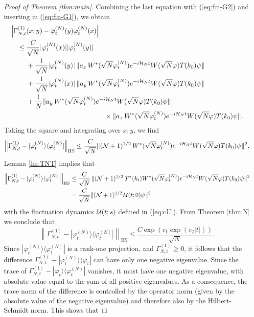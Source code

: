 \documentclass[11pt,a4paper]{article}
\newcommand{\cU}{{\cal U}}
\newcommand{\cH}{{\cal H}}
\newcommand{\cN}{{\cal N}}
\begin{document}
\begin{proof}[Proof of Theorem \ref{thm:main}]
Combining the last equation with (\ref{eq:fin-G2}) and inserting in (\ref{eq:fin-G1}), we obtain
\[ \begin{split} 
\Big| \Gamma^{(1)}_{N,t} &(x;y) - \overline{\varphi}_t^{(N)} (y) \varphi_t^{(N)} (x) \Big| \\ \leq \; & \frac{C}{\sqrt{N}} |\varphi_t^{(N)} (x)| |\varphi_t^{(N)} (y)| \\ &+ \frac{1}{\sqrt{N}} |\varphi^{(N)}_t (y)| \, \| a_x \, W^* (\sqrt{N} \varphi^{(N)}_t)  e^{-i\cH_N t} W(\sqrt{N} \varphi) T(k_0) \psi  \| \\ &+ \frac{1}{\sqrt{N}} |\varphi^{(N)}_t (x)| \, \| a_y \, W^* (\sqrt{N} \varphi^{(N)}_t)  e^{-i\cH_N t} W(\sqrt{N} \varphi) T(k_0) \psi  \| \\ & + \frac{1}{N} 
 \| a_y \, W^* (\sqrt{N} \varphi^{(N)}_t)  e^{-i\cH_N t} W(\sqrt{N} \varphi) T(k_0) \psi  \|   \\ &\hspace{4cm} \times \| a_x \, W^* (\sqrt{N} \varphi^{(N)}_t)  e^{-i\cH_N t} W(\sqrt{N} \varphi) T(k_0) \psi  \|. \end{split} \] 
Taking the square and integrating over $x,y$, we find
\[ \left\| \Gamma^{(1)}_{N,t} - |\varphi^{(N)}_t \rangle \langle \varphi_t^{(N)}| \right\|_{\text{HS}} \leq \frac{C}{\sqrt{N}} \| (\cN + 1)^{1/2} \,  W^* (\sqrt{N} \varphi^{(N)}_t) e^{-i\cH_N t} W(\sqrt{N} \varphi) T(k_0) \psi \|^2. \]
Lemma \ref{lm:TNT} implies that
\[ \begin{split} \left\| \Gamma^{(1)}_{N,t} - |\varphi^{(N)}_t \rangle \langle \varphi_t^{(N)}| \right\|_{\text{HS}}  \leq \; &\frac{C}{\sqrt{N}} \,  \| (\cN + 1)^{1/2} \, T^* (k_t) W^* (\sqrt{N} \varphi^{(N)}_t) e^{-i\cH_N t} W(\sqrt{N} \varphi) T(k_0) \psi \|^2 \\ =\; &\frac{C}{\sqrt{N}} \| (\cN + 1)^{1/2} \, \cU (t;0) \psi \|^2  
\end{split}\]
with the fluctuation dynamics $\cU (t;s)$ defined in (\ref{eq:cU}).
{F}rom Theorem \ref{thm:N} we conclude that
\[ \left\| \Gamma^{(1)}_{N,t} - |\varphi^{(N)}_t \rangle \langle \varphi_t^{(N)}| \right\|_{\text{HS}} \leq \frac{C\exp (c_1 \exp (c_2 |t|))}{\sqrt{N}}. \]
Since $|\varphi^{(N)}_t\rangle \langle \varphi^{(N)}_t|$ is a rank-one projection, and $\Gamma_{N,t}^{(1)} \geq 0$, it follows that the difference $\Gamma_{N,t}^{(1)} - |\varphi^{(N)}_t \rangle \langle \varphi_t|$ can have only  one negative eigenvalue. Since the trace of $\Gamma_{N,t}^{(1)} - |\varphi_t \rangle \langle \varphi^{(N)}_t|$ vanishes, it must have one negative eigenvalue, with absolute value equal to the sum of all positive eigenvalues. As a consequence, the trace norm of the difference is controlled by the operator norm (given by the absolute value of the negative eigenvalue) and therefore also by the Hilbert-Schmidt norm. This shows that

\end{proof}
\end{document}

